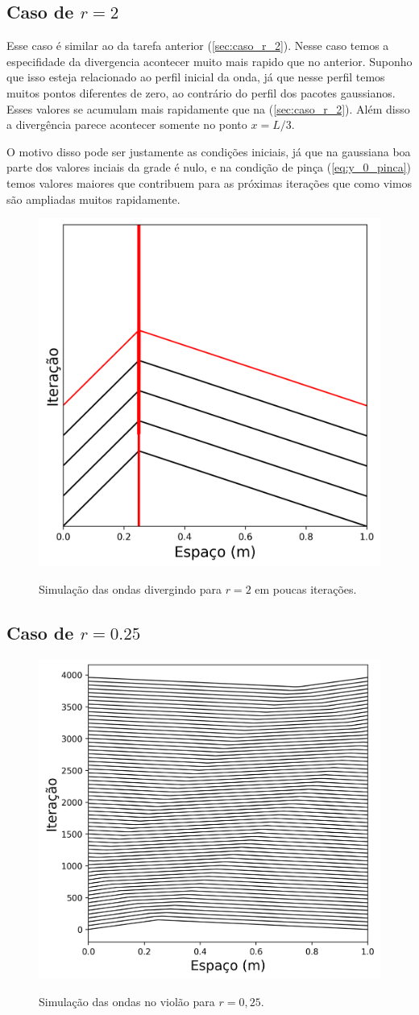 \documentclass[a4paper, 11pt]{tufte-handout}
\begin{document}
\subsection{Caso de \( r = 2 \) }

Esse caso é similar ao da tarefa anterior (\ref{sec:caso_r_2}). Nesse caso temos a especifidade da
divergencia acontecer muito mais rapido que no anterior. Suponho que isso esteja relacionado ao
perfil inicial da onda, já que nesse perfil temos muitos pontos diferentes de zero, ao contrário do
perfil dos pacotes gaussianos. Esses valores se acumulam mais rapidamente que na
(\ref{sec:caso_r_2}). Além disso a divergência parece acontecer somente no ponto \( x = L/3 \).

O motivo disso pode ser justamente as condições iniciais, já que na gaussiana boa parte dos valores
inciais da grade é nulo, e na condição de pinça (\ref{eq:y_0_pinca}) temos valores maiores que
contribuem para as próximas iterações que como vimos são ampliadas muitos rapidamente.

\begin{figure}[h!] 
    \centering
    \caption{Simulação das ondas divergindo para \( r = 2 \) em poucas iterações.}
    \includegraphics[width=0.5\linewidth]{graf-tarefa2-b}
    \label{fig:subB}
\end{figure}



\subsection{Caso de \( r = 0.25 \) }

\begin{figure}[h!] 
    \centering
    \caption{Simulação das ondas no violão para \( r = 0,25 \). }
    \includegraphics[width=0.5\linewidth]{graf-tarefa2-c1}
    \label{fig:tarefa2_c1}
\end{figure}
\end{document}
